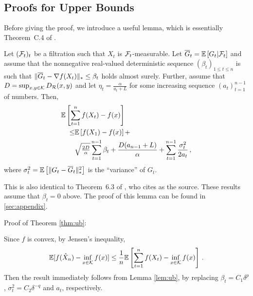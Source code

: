 \subsection{Proofs for Upper Bounds}
\label{sec:ub-proof}

Before giving the proof, we introduce a useful lemma, which is essentially Theorem~C.4 of \cite{MahdaviPhd:2014}.
\begin{lemma}
\label{lem:ub}
Let $(\mathcal{F}_t)_{t}$ be a filtration such that $X_t$ is $\mathcal{F}_t$-measurable.
Let $\overline G_t = \mathbb{E}\left[G_t|\mathcal{F}_t\right]$ 
and assume that the nonnegative real-valued deterministic sequence $(\beta_t)_{1\le t\le n}$ is such that 
$\|\overline G_t - \nabla f(X_t)\|_* \le \beta_t$ holds almost surely. 
Further, assume that $D=\sup_{x,y\in \mathcal{K}} D_{\mathcal{R}}(x,y)$ and let $\eta_t = \frac{\alpha}{a_t+L}$ for some increasing 
sequence $(a_t)_{t=1}^{n-1}$ of numbers. Then, 
\begin{align*}
\MoveEqLeft \EE{ \sum_{t=1}^n f(X_t) - f(x) }  \\
\le& 	 \EE{f(X_1)-f(x)}+ \\
 & \sqrt{\tfrac{2D}{\alpha}} \sum_{t=1}^{n-1} \beta_t 
 +\frac{D(a_{n-1}+L)}{\alpha} +
	  \sum_{t=1}^{n-1}\frac{\sigma_t^2}{2a_t}\,,
\end{align*}
where $\sigma_t^2 = \mathbb{E}\left[ \|G_t-\overline G_t\|_*^2\right]$ is the ``variance'' of $G_t$.
\end{lemma}
This is also identical to Theorem~6.3 of \cite{Bu:Convex14}, who cites \cite{Dekel:minibatch12} as the source. These results assume that $\beta_t=0$ above.
The proof of this lemma can be found in \cref{sec:appendix}.

Proof of Theorem \ref{thm:ub}:

Since $f$ is convex, by Jensen's inequality,
\[
 \mathbb{E}[f(\hat X_n) - \inf_{x \in \mathcal{K}} f(x)] \le  \dfrac{1}{n}\mathbb{E}\left[ \sum_{t=1}^n f(X_t) - \inf_{x \in \mathcal{K}}f(x) \right] \,.
\]
Then the result immediately follows from Lemma \ref{lem:ub}, by replacing
 $\beta_t = C_1\delta^p$, $\sigma^2_t = C_2 \delta^{-q}$ and $a_t$, respectively.